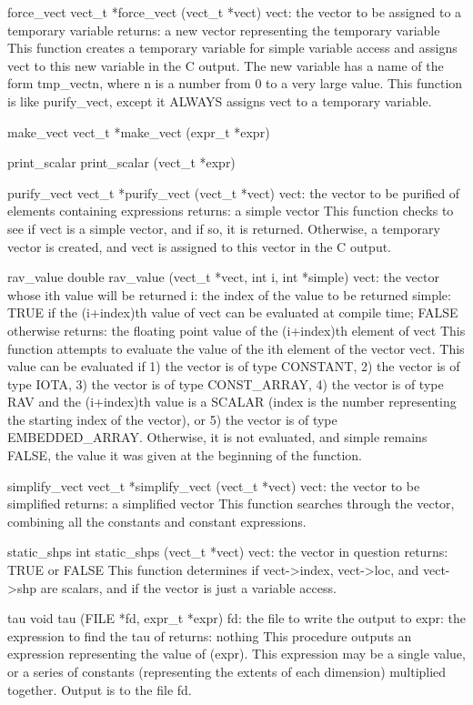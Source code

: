 force_vect
  vect_t *force_vect (vect_t *vect)
    vect:  the vector to be assigned to a temporary variable
    returns:  a new vector representing the temporary variable
  This function creates a temporary variable for simple variable
  access and assigns vect to this new variable in the C output.  The new
  variable has a name of the form tmp_vectn, where n is a number from
  0 to a very large value.  This function is like purify_vect, except
  it ALWAYS assigns vect to a temporary variable.

make_vect
  vect_t *make_vect (expr_t *expr)

print_scalar
  print_scalar (vect_t *expr)

purify_vect
  vect_t *purify_vect (vect_t *vect)
    vect:  the vector to be purified of elements containing expressions
    returns:  a simple vector
  This function checks to see if vect is a simple vector, and if so, it
  is returned.  Otherwise, a temporary vector is created, and vect is
  assigned to this vector in the C output.  

rav_value
  double rav_value (vect_t *vect, int i, int *simple)
    vect:  the vector whose ith value will be returned
    i:  the index of the value to be returned
    simple:  TRUE if the (i+index)th value of vect can be evaluated at
             compile time;  FALSE otherwise
    returns:  the floating point value of the (i+index)th element of
              vect
  This function attempts to evaluate the value of the ith element
  of the vector vect.  This value can be evaluated if 1) the vector
  is of type CONSTANT, 2) the vector is of type IOTA, 3) the vector
  is of type CONST_ARRAY, 4) the vector is of type RAV and the
  (i+index)th value is a SCALAR (index is the number representing
  the starting index of the vector), or 5) the vector is of type
  EMBEDDED_ARRAY.  Otherwise, it is not evaluated, and simple
  remains FALSE, the value it was given at the beginning of the
  function.

simplify_vect
  vect_t *simplify_vect (vect_t *vect)
    vect:  the vector to be simplified
    returns:  a simplified vector
  This function searches through the vector, combining all the 
  constants and constant expressions.

static_shps
  int static_shps (vect_t *vect)
    vect:  the vector in question
    returns:  TRUE or FALSE
  This function determines if vect->index, vect->loc, and vect->shp are
  scalars, and if the vector is just a variable access.

tau
  void tau (FILE *fd, expr_t *expr)
    fd:  the file to write the output to 
    expr:  the expression to find the tau of
    returns:  nothing
  This procedure outputs an expression representing the value of \tau (expr).
  This expression may be a single value, or a series of constants
  (representing the extents of each dimension) multiplied together.  
  Output is to the file fd.

